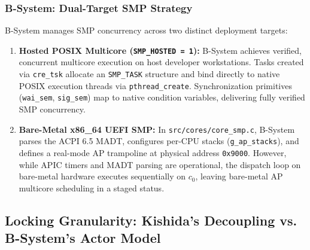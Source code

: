 \documentclass[10pt,journal,compsoc,twocolumn]{article}
\begin{document}
\subsubsection{B-System: Dual-Target SMP Strategy}
B-System manages SMP concurrency across two distinct deployment targets:
\begin{enumerate}[leftmargin=*]
    \item \textbf{Hosted POSIX Multicore (\texttt{SMP\_HOSTED = 1}):} B-System achieves verified, concurrent multicore execution on host developer workstations. Tasks created via \texttt{cre\_tsk} allocate an \texttt{SMP\_TASK} structure and bind directly to native POSIX execution threads via \texttt{pthread\_create}. Synchronization primitives (\texttt{wai\_sem}, \texttt{sig\_sem}) map to native condition variables, delivering fully verified SMP concurrency.
    \item \textbf{Bare-Metal x86\_64 UEFI SMP:} In \texttt{src/cores/core\_smp.c}, B-System parses the ACPI 6.5 MADT, configures per-CPU stacks (\texttt{g\_ap\_stacks}), and defines a real-mode AP trampoline at physical address \texttt{0x9000}. However, while APIC timers and MADT parsing are operational, the dispatch loop on bare-metal hardware executes sequentially on $c_0$, leaving bare-metal AP multicore scheduling in a staged status.
\end{enumerate}

\subsection{Locking Granularity: Kishida's Decoupling vs. B-System's Actor Model}
\end{document}
